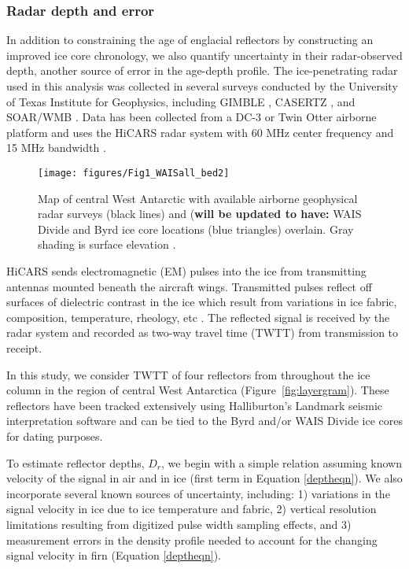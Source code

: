 \subsubsection{Radar depth and error}
In addition to constraining the age of englacial reflectors by constructing an improved ice core chronology, we also quantify uncertainty in their radar-observed depth, another source of error in the age-depth profile. The ice-penetrating radar used in this analysis was collected in several surveys conducted by the University of Texas Institute for Geophysics, including GIMBLE \citep{young2012}, CASERTZ \citep{blankenship2001}, and SOAR/WMB \citep{luyendyk2003}. Data has been collected from a DC-3 or Twin Otter airborne platform and uses the HiCARS radar system with 60 MHz center frequency and 15 MHz bandwidth \citep{peters2005}. 


\begin{figure}[h]
\centering
\texttt{[image: figures/Fig1\_WAISall\_bed2]}
\caption{Map of central West Antarctic with available airborne geophysical radar surveys (black lines) and (\textbf{will be updated to have:} WAIS Divide and Byrd ice core locations (blue triangles) overlain. Gray shading is surface elevation \citep{fretwell2013}. }
\label{fig:radarmap}
\end{figure}


HiCARS sends electromagnetic (EM) pulses into the ice from transmitting antennas mounted beneath the aircraft wings. Transmitted pulses reflect off surfaces of dielectric contrast in the ice which result from variations in ice fabric, composition, temperature, rheology, etc \citep{fujita2000}. The reflected signal is received by the radar system and recorded as two-way travel time (TWTT) from transmission to receipt. 

In this study, we consider TWTT of four reflectors from throughout the ice column in the region of central West Antarctica (Figure~\ref{fig:layergram}). These reflectors have been tracked extensively using Halliburton's Landmark seismic interpretation software and can be tied to the Byrd and/or WAIS Divide ice cores for dating purposes. %

To estimate reflector depths, $D_r$, we begin with a simple relation assuming known velocity of the signal in air and in ice (first term in Equation \ref{deptheqn}). We also incorporate several known sources of uncertainty, including: 1) variations in the signal velocity in ice due to ice temperature and fabric, 2) vertical resolution limitations resulting from digitized pulse width sampling effects, and 3) measurement errors in the density profile needed to account for the changing signal velocity in firn (Equation \ref{deptheqn}).

